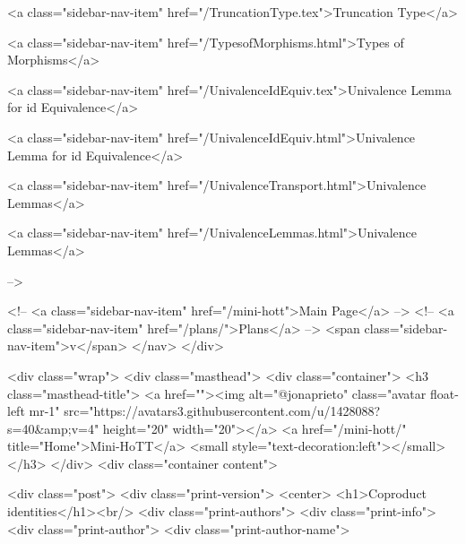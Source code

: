       
    
      
        
          <a class="sidebar-nav-item" href="/TruncationType.tex">Truncation Type</a>
        
      
    
      
        
          <a class="sidebar-nav-item" href="/TypesofMorphisms.html">Types of Morphisms</a>
        
      
    
      
        
          <a class="sidebar-nav-item" href="/UnivalenceIdEquiv.tex">Univalence Lemma for id Equivalence</a>
        
      
    
      
        
          <a class="sidebar-nav-item" href="/UnivalenceIdEquiv.html">Univalence Lemma for id Equivalence</a>
        
      
    
      
        
          <a class="sidebar-nav-item" href="/UnivalenceTransport.html">Univalence Lemmas</a>
        
      
    
      
        
          <a class="sidebar-nav-item" href="/UnivalenceLemmas.html">Univalence Lemmas</a>
        
      
     -->

    <!-- <a class="sidebar-nav-item" href="/mini-hott">Main Page</a> -->
    <!-- <a class="sidebar-nav-item" href="/plans/">Plans</a> -->
    <span class="sidebar-nav-item">v</span>
  </nav>
</div>

    <div class="wrap">
      <div class="masthead">
        <div class="container">
          <h3 class="masthead-title">
            <a href=""><img alt="@jonaprieto" class="avatar float-left mr-1" src="https://avatars3.githubusercontent.com/u/1428088?s=40&amp;v=4" height="20" width="20"></a>
            <a href="/mini-hott/" title="Home">Mini-HoTT</a>
            <small style="text-decoration:left"></small>
          </h3>
        </div>
      <div class="container content">
        







<div class="post">
  <div class="print-version">
    <center>
      <h1>Coproduct identities</h1><br/>
        <div class="print-authors">
          <div class="print-info">
            <div class="print-author">
              <div class="print-author-name">
                
